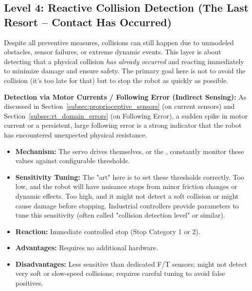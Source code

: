 \subsection{Level 4: Reactive Collision Detection (The Last Resort – Contact Has Occurred)}
\label{subsec:reactive_collision_detection}
Despite all preventive measures, collisions can still happen due to unmodeled obstacles, sensor failures, or extreme dynamic events. This layer is about detecting that a physical collision \textit{has already occurred} and reacting immediately to minimize damage and ensure safety. The primary goal here is not to avoid the collision (it's too late for that) but to stop the robot as quickly as possible.


\textbf{Detection via Motor Currents / Following Error (Indirect Sensing):}
    As discussed in Section~\ref{subsec:proprioceptive_sensors} (on current sensors) and Section~\ref{subsec:rt_domain_errors} (on Following Error), a sudden spike in motor current or a persistent, large following error is a strong indicator that the robot has encountered unexpected physical resistance.
    \begin{itemize}
        \item \textbf{Mechanism:} The servo drives themselves, or the , constantly monitor these values against configurable thresholds.
        \item \textbf{Sensitivity Tuning:} The "art" here is to set these thresholds correctly. Too low, and the robot will have nuisance stops from minor friction changes or dynamic effects. Too high, and it might not detect a soft collision or might cause damage before stopping. Industrial controllers provide parameters to tune this sensitivity (often called "collision detection level" or similar).
        \item \textbf{Reaction:} Immediate controlled stop (Stop Category 1 or 2).
        \item \textbf{Advantages:} Requires no additional hardware.
        \item \textbf{Disadvantages:} Less sensitive than dedicated F/T sensors; might not detect very soft or slow-speed collisions; requires careful tuning to avoid false positives.
    \end{itemize}

